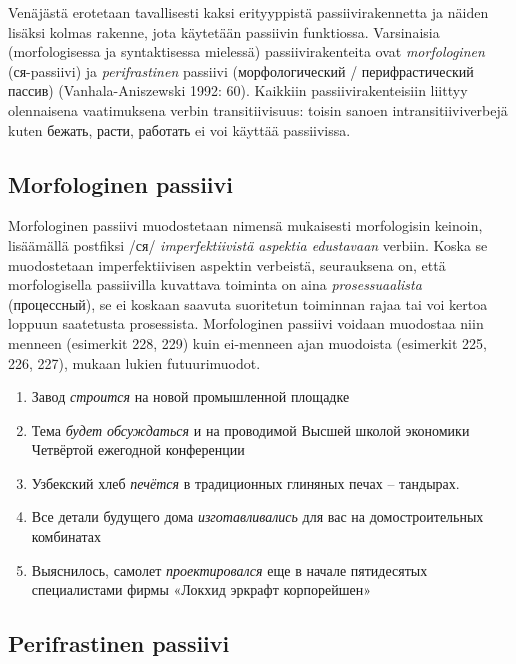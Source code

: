 \documentclass[]{scrreprt}
\providecommand{\tightlist}{%
  \setlength{\itemsep}{0pt}\setlength{\parskip}{0pt}}
\begin{document}
Venäjästä erotetaan tavallisesti kaksi erityyppistä passiivirakennetta
ja näiden lisäksi kolmas rakenne, jota käytetään passiivin funktiossa.
Varsinaisia (morfologisessa ja syntaktisessa mielessä)
passiivirakenteita ovat \emph{morfologinen} (ся-passiivi) ja
\emph{perifrastinen} passiivi (морфологический / перифрастический
пассив) (Vanhala-Aniszewski 1992: 60). Kaikkiin passiivirakenteisiin
liittyy olennaisena vaatimuksena verbin transitiivisuus: toisin sanoen
intransitiiviverbejä kuten бежать, расти, работать ei voi käyttää
passiivissa.

\subsection{Morfologinen passiivi}\label{morfologinen-passiivi}

Morfologinen passiivi muodostetaan nimensä mukaisesti morfologisin
keinoin, lisäämällä postfiksi /ся/ \emph{imperfektiivistä aspektia
edustavaan} verbiin. Koska se muodostetaan imperfektiivisen aspektin
verbeistä, seurauksena on, että morfologisella passiivilla kuvattava
toiminta on aina \emph{prosessuaalista} (процессный), se ei koskaan
saavuta suoritetun toiminnan rajaa tai voi kertoa loppuun saatetusta
prosessista. Morfologinen passiivi voidaan muodostaa niin menneen
(esimerkit 228, 229) kuin ei-menneen ajan muodoista (esimerkit 225, 226,
227), mukaan lukien futuurimuodot.

\begin{enumerate}
\def\labelenumi{(\arabic{enumi})}
\setcounter{enumi}{224}
\tightlist
\item
  Завод \emph{строится} на новой промышленной площадке
\item
  Тема \emph{будет обсуждаться} и на проводимой Высшей школой экономики
  Четвёртой ежегодной конференции
\item
  Узбекский хлеб \emph{печётся} в традиционных глиняных печах --
  тандырах.
\item
  Все детали будущего дома \emph{изготавливались} для вас на
  домостроительных комбинатах
\item
  Выяснилось, самолет \emph{проектировался} еще в начале пятидесятых
  специалистами фирмы «Локхид эркрафт корпорейшен»
\end{enumerate}

\subsection{Perifrastinen passiivi}\label{perifrastinen-passiivi}
\end{document}
